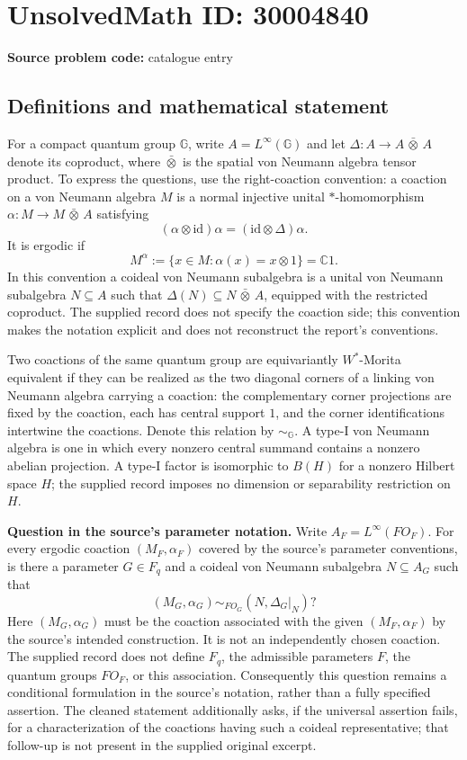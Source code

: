 \documentclass[11pt]{article}
\newcommand{\C}{\mathbb{C}}
\begin{document}
\section*{UnsolvedMath ID: 30004840}
\textbf{Source problem code:} catalogue entry
\subsection{Definitions and mathematical statement}
For a compact quantum group \(\mathbb G\), write \(A=L^\infty(\mathbb G)\) and let \(\Delta:A\to A\,\bar\otimes\,A\) denote its coproduct, where \(\bar\otimes\) is the spatial von Neumann algebra tensor product. To express the questions, use the right-coaction convention: a coaction on a von Neumann algebra \(M\) is a normal injective unital \(*\)-homomorphism \(\alpha:M\to M\,\bar\otimes\,A\) satisfying
\[
(\alpha\otimes\mathrm{id})\alpha=(\mathrm{id}\otimes\Delta)\alpha.
\]
It is ergodic if
\[
M^\alpha:=\{x\in M:\alpha(x)=x\otimes1\}=\C1.
\]
In this convention a coideal von Neumann subalgebra is a unital von Neumann subalgebra \(N\subseteq A\) such that \(\Delta(N)\subseteq N\,\bar\otimes\,A\), equipped with the restricted coproduct. The supplied record does not specify the coaction side; this convention makes the notation explicit and does not reconstruct the report's conventions.

Two coactions of the same quantum group are equivariantly \(W^*\)-Morita equivalent if they can be realized as the two diagonal corners of a linking von Neumann algebra carrying a coaction: the complementary corner projections are fixed by the coaction, each has central support \(1\), and the corner identifications intertwine the coactions. Denote this relation by \(\sim_{\mathbb G}\). A type-I von Neumann algebra is one in which every nonzero central summand contains a nonzero abelian projection. A type-I factor is isomorphic to \(B(H)\) for a nonzero Hilbert space \(H\); the supplied record imposes no dimension or separability restriction on \(H\).

\textbf{Question in the source's parameter notation.} Write \(A_F=L^\infty(FO_F)\). For every ergodic coaction \((M_F,\alpha_F)\) covered by the source's parameter conventions, is there a parameter \(G\in F_q\) and a coideal von Neumann subalgebra \(N\subseteq A_G\) such that
\[
(M_G,\alpha_G)\sim_{FO_G}(N,\Delta_G|_N)?
\]
Here \((M_G,\alpha_G)\) must be the coaction associated with the given \((M_F,\alpha_F)\) by the source's intended construction. It is not an independently chosen coaction. The supplied record does not define \(F_q\), the admissible parameters \(F\), the quantum groups \(FO_F\), or this association. Consequently this question remains a conditional formulation in the source's notation, rather than a fully specified assertion. The cleaned statement additionally asks, if the universal assertion fails, for a characterization of the coactions having such a coideal representative; that follow-up is not present in the supplied original excerpt.
\end{document}
